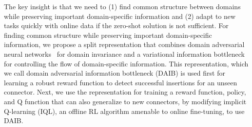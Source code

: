 \documentclass[letterpaper, 10 pt, conference, final]{ieeeconf}   %
\def\methodname {domain adversarial information bottleneck{}}
\def\methodabbrv {DAIB{}}
\begin{document}

The key insight is that we need to (1) find common structure between domains while preserving important domain-specific information and (2) adapt to new tasks quickly with online data if the zero-shot solution is not sufficient.
For finding common structure while preserving important domain-specific information, we propose a split representation that combines domain adversarial neural networks~\cite{ganin2016domainadversarial} for domain invariance and a variational information bottleneck~\cite{alemi2017vib}
for controlling the flow of domain-specific information.
This representation, which we call \methodname{} (\methodabbrv) is used first for learning a robust reward function to detect successful insertions for an unseen connector.
Next, we use the representation for training a reward function, policy, and Q function that can also generalize to new connectors, by modifying implicit Q-learning (IQL), an offline RL algorithm amenable to online fine-tuning, to use \methodabbrv{}.
\end{document}
